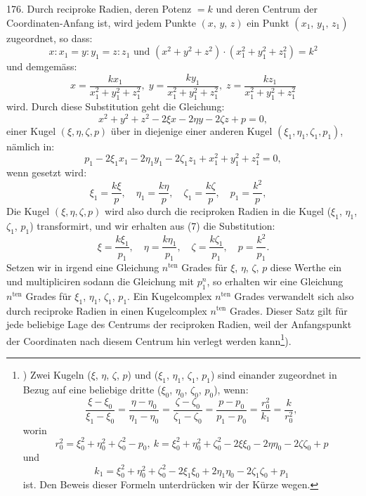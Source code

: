 176. Durch reciproke Radien, deren Potenz $= k$ und
deren Centrum der Coordinaten-Anfang ist, wird jedem Punkte
$(x,\, y,\, z)$ ein Punkt $(x_1,\, y_1,\, z_1)$ zugeordnet, so dass:
\[
  x: x_1 = y: y_1 = z: z_1 \text{ und }
 (x^2 + y^2 + z^2) \cdot (x_1^2 + y_1^2 + z_1^2) = k^2
\]
und demgem\"ass:
\[
\tag{6}
  x = \frac{kx_1}{x_1^2 + y_1^2 + z_1^2}, \;
  y = \frac{ky_1}{x_1^2 + y_1^2 + z_1^2}, \;
  z = \frac{kz_1}{x_1^2 + y_1^2 + z_1^2}
\]
wird. Durch diese Substitution geht die Gleichung:
\[
  x^2 + y^2 + z^2 - 2\xi x - 2\eta y - 2\zeta z + p = 0,
\]
einer Kugel $(\xi, \eta, \zeta, p)$ \"uber in diejenige einer anderen Kugel
$(\xi_1, \eta_1, \zeta_1, p_1)$, n\"amlich in:
\[
  p_1 - 2\xi_1 x_1 - 2\eta_1 y_1 - 2\zeta_1 z_1
+ x_1^2 + y_1^2 + z_1^2 = 0,
\]
wenn gesetzt wird:
\[
\tag{7}
  \xi_1 = \frac{k\xi}{p}, \quad
  \eta_1 = \frac{k\eta}{p}, \quad
  \zeta_1 = \frac{k\zeta}{p}, \quad
   p_1 = \frac{k^2}{p}, \quad
\]
Die Kugel $(\xi, \eta, \zeta, p)$ wird also durch die reciproken Radien
in die Kugel ($\xi_1$, $\eta_1$, $\zeta_1$, $p_1$) transformirt, und wir erhalten
aus (7) die Substitution:
\[
  \xi   = \frac{k   \xi_1}{p_1},  \quad
  \eta  = \frac{k  \eta_1}{p_1},  \quad
  \zeta = \frac{k \zeta_1}{p_1},  \quad
  p     = \frac{k^2      }{p_1}.
\]
Setzen wir in irgend eine Gleichung $n^{\text{ten}}$ Grades f\"ur
$\xi$, $\eta$, $\zeta$, $p$
diese Werthe ein und multipliciren sodann die Gleichung
mit $p_1^n$, so erhalten wir eine Gleichung $n^{\text{ten}}$ Grades f\"ur
$\xi_1$, $\eta_1$, $\zeta_1$, $p_1$.
Ein Kugelcomplex $n^{\text{ten}}$ Grades verwandelt sich
also durch reciproke Radien in einen Kugelcomplex $n^{\text{ten}}$
Grades. Dieser Satz gilt f\"ur jede beliebige Lage des Centrums
der reciproken Radien, weil der Anfangspunkt der Coordinaten
nach diesem Centrum hin verlegt werden kann\footnote{)
  Zwei Kugeln ($\xi$, $\eta$, $\zeta$, $p$) und
  ($\xi_1$, $\eta_1$, $\zeta_1$, $p_1$) sind einander zugeordnet
  in Bezug auf eine beliebige dritte
  ($\xi_0$, $\eta_0$, $\zeta_0$, $p_0$), wenn:
\[
  \frac{\xi  -  \xi_0}{\xi_1  -  \xi_0}
= \frac{\eta - \eta_0}{\eta_1 - \eta_0}
= \frac{\zeta-\zeta_0}{\zeta_1-\zeta_0}
= \frac{ p   -    p_0}{ p_1   -    p_0}
= \frac{r_0^2}{k_1} = \frac{k}{r_0^2},
\]
  worin
\[
  r_0^2 = \xi_0^2 + \eta_0^2 + \zeta_0^2 - p_0,\
  k = \xi_0^2 + \eta_0^2 + \zeta_0^2
  - 2\xi\xi_0 - 2\eta\eta_0 - 2\zeta\zeta_0 + p
\]
  und
\[
  k_1 = \xi_0^2 + \eta_0^2 + \zeta_0^2
      - 2\xi_1\xi_0 + 2\eta_1\eta_0 - 2\zeta_1\zeta_0 + p_1
\]
  ist. Den Beweis dieser Formeln unterdr\"ucken wir der K\"urze wegen.}).

